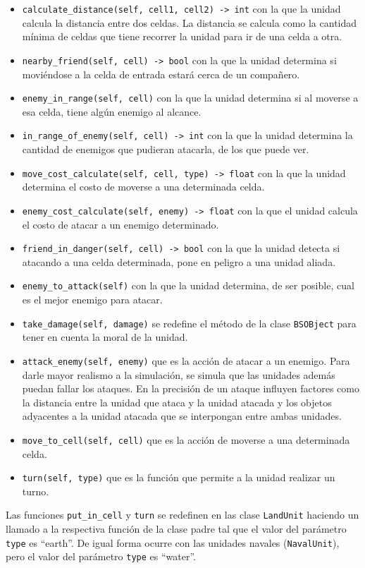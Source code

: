 \begin{itemize}
	\item \verb|calculate_distance(self, cell1, cell2) -> int| con la que la unidad calcula la distancia entre dos celdas. La distancia se calcula como la cantidad m\'inima de celdas que tiene recorrer la unidad para ir de una celda a otra.
	\item \verb|nearby_friend(self, cell) -> bool| con la que la unidad determina si movi\'endose a la celda de entrada estar\'a cerca de un compa\~{n}ero.
	\item \verb|enemy_in_range(self, cell)| con la que la unidad determina si al moverse a esa celda, tiene alg\'un enemigo al alcance.
	\item \verb|in_range_of_enemy(self, cell) -> int| con la que la unidad determina la cantidad de enemigos que pudieran atacarla, de los que puede ver.
	\item \verb|move_cost_calculate(self, cell, type) -> float| con la que la unidad determina el costo de moverse a una determinada celda.
	\item \verb|enemy_cost_calculate(self, enemy) -> float| con la que el unidad calcula el costo de atacar a un enemigo determinado.
	\item \verb|friend_in_danger(self, cell) -> bool| con la que la unidad detecta si atacando a una celda determinada, pone en peligro a una unidad aliada.
	\item \verb|enemy_to_attack(self)| con la que la unidad determina, de ser posible, cual es el mejor enemigo para atacar.
	\item \verb|take_damage(self, damage)| se redefine el m\'etodo de la clase \verb|BSOBject| para tener  en cuenta la moral de la unidad.
	\item \verb|attack_enemy(self, enemy)| que es la acci\'on de atacar a un enemigo. Para darle mayor realismo a la simulaci\'on, se simula que las unidades adem\'as puedan fallar los ataques. En la precisi\'on de un ataque influyen  factores como la distancia entre la unidad que ataca y la unidad atacada y los objetos adyacentes a la unidad atacada que se interpongan entre ambas unidades.
	\item \verb|move_to_cell(self, cell)| que es la acci\'on de moverse a una determinada celda.
	\item \verb|turn(self, type)| que es la funci\'on que permite a la unidad realizar un turno.
\end{itemize}

Las funciones \verb|put_in_cell| y \verb|turn| se redefinen en las clase \verb|LandUnit| haciendo un llamado a la respectiva funci\'on de la clase padre tal que el valor del par\'ametro \verb|type| es ``earth''. De igual forma ocurre con las unidades navales (\verb|NavalUnit|), pero el valor del par\'ametro \verb|type| es ``water''.

